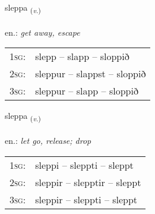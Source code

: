 \documentclass[frontgrid, backgrid]{flacards}\usepackage[]{graphicx}\usepackage[]{xcolor}
\begin{document}
\renewcommand{\flhead}{\vskip5pt \fboxsep=0pt {\small\bfseries\footnotesize Sagnorð | Verb}}
\renewcommand{\fcfoot}{\vskip5pt \fboxsep=0pt \hspace{2pt}{\small\bfseries\footnotesize 1K}}

\renewcommand{\blhead}{\vskip5pt {\small\bfseries\footnotesize Sagnorð | Verb }}
\renewcommand{\bcfoot}{\vskip5pt \hspace{2pt}{\small\bfseries\footnotesize 1K}}


{sleppa \small{\textsubscript{(\textit{v.})}} \\[1ex] %
\textphonetic{[stlɛhpa]} \\
en.: \emph{get away, escape} \\  [2ex]
\renewcommand*{\arraystretch}{0.8}
\begin{tabular}{p{1cm}l}
\textsc{1sg}: & slepp -- slapp -- sloppið \\ 
\textsc{2sg}: & sleppur -- slappst -- sloppið \\ 
\textsc{3sg}: & sleppur -- slapp -- sloppið \\ 
\end{tabular}
}

\renewcommand{\flhead}{\vskip5pt \fboxsep=0pt {\small\bfseries\footnotesize Sagnorð | Verb}}
\renewcommand{\fcfoot}{\vskip5pt \fboxsep=0pt \hspace{2pt}{\small\bfseries\footnotesize 1K}}

\renewcommand{\blhead}{\vskip5pt {\small\bfseries\footnotesize Sagnorð | Verb }}
\renewcommand{\bcfoot}{\vskip5pt \hspace{2pt}{\small\bfseries\footnotesize 1K}}


{sleppa \small{\textsubscript{(\textit{v.})}} \\[1ex] %
\textphonetic{[stlɛhpa]} \\
en.: \emph{let go, release; drop} \\  [2ex]
\renewcommand*{\arraystretch}{0.8}
\begin{tabular}{p{1cm}l}
\textsc{1sg}: & sleppi -- sleppti -- sleppt \\ 
\textsc{2sg}: & sleppir -- slepptir -- sleppt \\ 
\textsc{3sg}: & sleppir -- sleppti -- sleppt \\ 
\end{tabular}
}
\end{document}
